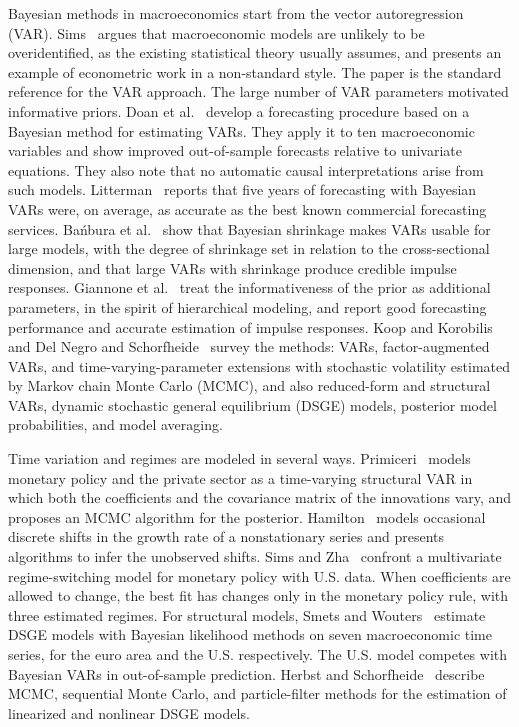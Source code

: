   Bayesian methods in macroeconomics start from the vector autoregression (VAR).
  Sims~\cite{sims1980macroeconomics} argues that macroeconomic models are unlikely to
  be overidentified, as the existing statistical theory usually assumes, and
  presents an example of econometric work in a non-standard style. The paper is
  the standard reference for the VAR approach. The large number of VAR
  parameters motivated informative priors. Doan et al.~\cite{doan1984forecasting} develop a
  forecasting procedure based on a Bayesian method for estimating VARs. They
  apply it to ten macroeconomic variables and show improved out-of-sample
  forecasts relative to univariate equations. They also note that no automatic
  causal interpretations arise from such models. Litterman~\cite{litterman1986forecasting}
  reports that five years of forecasting with Bayesian VARs were, on average, as
  accurate as the best known commercial forecasting services.
  Ba{\'n}bura et al.~\cite{banbura2010large} show that Bayesian shrinkage makes VARs usable for
  large models, with the degree of shrinkage set in relation to the
  cross-sectional dimension, and that large VARs with shrinkage produce
  credible impulse responses. Giannone et al.~\cite{giannone2015prior} treat the informativeness
  of the prior as additional parameters, in the spirit of hierarchical
  modeling, and report good forecasting performance and accurate estimation of
  impulse responses. Koop and Korobilis~\cite{koop2010bayesian} and Del Negro and
  Schorfheide~\cite{delnegro2011bayesian} survey the methods: VARs, factor-augmented VARs, and time-varying-parameter
  extensions with stochastic volatility estimated by Markov chain Monte Carlo
  (MCMC), and also reduced-form and structural VARs, dynamic stochastic general
  equilibrium (DSGE) models, posterior model probabilities, and model
  averaging.

  Time variation and regimes are modeled in several ways. Primiceri~\cite{primiceri2005time}
  models monetary policy and the private sector as a time-varying structural
  VAR in which both the coefficients and the covariance matrix of the
  innovations vary, and proposes an MCMC algorithm for the posterior.
  Hamilton~\cite{hamilton1989new} models occasional discrete shifts in the growth rate of
  a nonstationary series and presents algorithms to infer the unobserved
  shifts. Sims and Zha~\cite{sims2006were} confront a multivariate regime-switching model
  for monetary policy with U.S. data. When coefficients are allowed to change,
  the best fit has changes only in the monetary policy rule, with three
  estimated regimes. For structural models, Smets and Wouters~\cite{smets2003estimated,smets2007shocks}
  estimate DSGE models with Bayesian likelihood methods
  on seven macroeconomic time series, for the euro area and the U.S.
  respectively. The U.S. model competes with Bayesian VARs in out-of-sample
  prediction. Herbst and Schorfheide~\cite{herbst2016bayesian} describe MCMC, sequential Monte Carlo,
  and particle-filter methods for the estimation of linearized and nonlinear
  DSGE models.

